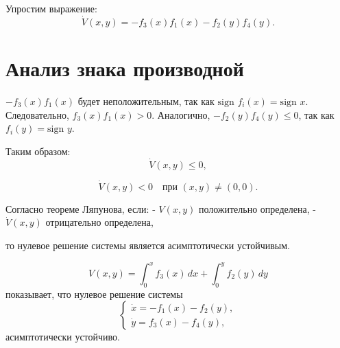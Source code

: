 \documentclass[a4paper,12pt]{extarticle} %
\begin{document}
Упростим выражение:
\[
\dot{V}(x, y) = -f_3(x)f_1(x) - f_2(y)f_4(y).
\]

\section*{Анализ знака производной}

\(-f_3(x)f_1(x)\) будет неположительным, так как \(\text{sign } f_i(x) = \text{sign } x\). Следовательно, \(f_3(x)f_1(x) > 0\).
Аналогично, \(-f_2(y)f_4(y) \leq 0\), так как \(f_i(y) = \text{sign } y\).

Таким образом:
\[
\dot{V}(x, y) \leq 0,
\]

\[
\dot{V}(x, y) < 0 \quad \text{при } (x, y) \neq (0, 0).
\]


Согласно теореме Ляпунова, если:
- \(V(x, y)\) положительно определена,
- \(\dot{V}(x, y)\) отрицательно определена,

то нулевое решение системы является асимптотически устойчивым.


\[
V(x, y) = \int_{0}^{x} f_3(x)\,dx + \int_{0}^{y} f_2(y)\,dy
\]
показывает, что нулевое решение системы
\[
\begin{cases}
\dot{x} = -f_1(x) - f_2(y), \\
\dot{y} = f_3(x) - f_4(y),
\end{cases}
\]
асимптотически устойчиво.
\end{document}
